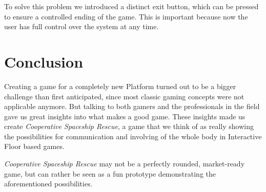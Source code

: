 \documentclass{sigchi}
\begin{document}
To solve this problem we introduced a distinct exit button, which can be pressed to ensure a controlled ending of the game. This is important because now the user has full control over the system at any time. 

\section{Conclusion}
\vspace{1mm}

Creating a game for a completely new Platform turned out to be a bigger challenge than first anticipated, since most classic gaming concepts were not applicable anymore. But talking to both gamers and the professionals in the field gave us great insights into what makes a good game. These insights made us create \textit{Cooperative Spaceship Rescue}, a game that we think of as really showing the possibilities for communication and involving of the whole body in Interactive Floor based games. \newline


\textit{Cooperative Spaceship Rescue} may not be a perfectly rounded, market-ready game, but can rather be seen as a fun prototype demonstrating the aforementioned possibilities.


\balance
\end{document}
